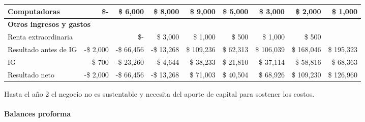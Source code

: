\begin{center}
\begin{adjustbox}{width=\textwidth,center}
\begin{tabular}{l|rrrrrrrr}
\hline
Computadoras & \$- & \$ 6,000 & \$ 8,000 & \$ 9,000 & \$ 5,000 & \$ 3,000 & \$ 2,000 & \$ 1,000 \\
\hline
\multicolumn{9}{l}{\textbf{Otros ingresos y gastos}} \\
\hline
Renta extraordinaria & & \$- & \$ 3,000 & \$ 1,000 & \$ 500 & \$ 1,000 & \$ 500 & \\
\hline
Resultado antes de IG & -\$ 2,000 & -\$ 66,456 & -\$ 13,268 & \$ 109,236 & \$ 62,313 & \$ 106,039 & \$ 168,046 & \$ 195,323 \\
\hline
IG & -\$ 700 & -\$ 23,260 & -\$ 4,644 & \$ 38,233 & \$ 21,810 & \$ 37,114 & \$ 58,816 & \$ 68,363 \\
\hline
Resultado neto & -\$ 2,000 & -\$ 66,456 & -\$ 13,268 & \$ 71,003 & \$ 40,504 & \$ 68,926 & \$ 109,230 & \$ 126,960 \\
\hline
\end{tabular}
\end{adjustbox}
\end{center}

Hasta el año 2 el negocio no es sustentable y necesita del aporte de capital para sostener los costos. 


\clearpage


\paragraph{Balances proforma}

